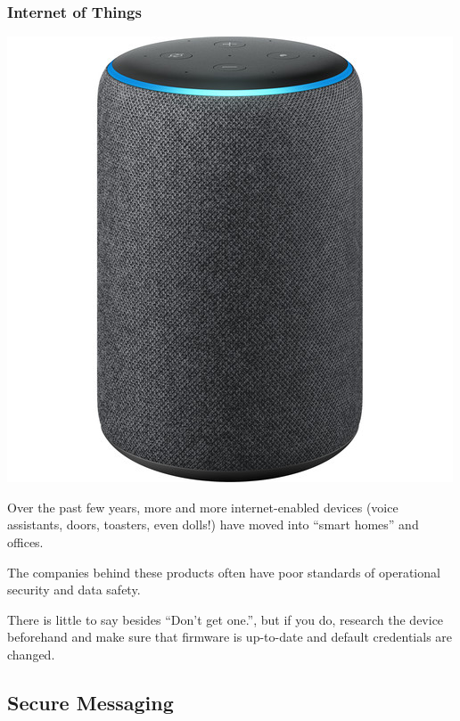 \documentclass[aspectratio=1610,dvipsnames]{beamer}
\begin{document}
\begin{frame}
\frametitle{Internet of Things}

\begin{minipage}{0.4\textwidth}
\begin{center}
\includegraphics[scale=0.25,keepaspectratio]{images/alexa}
\end{center}
\end{minipage}%
\begin{minipage}{0.6\textwidth}
Over the past few years, more and more internet-enabled devices (voice assistants, doors, toasters, even dolls!) have moved into ``smart homes'' and offices.
\pause\medskip

The companies behind these products often have poor standards of operational security and data safety. 
\pause\medskip

There is little to say besides ``Don't get one.'', but if you do, research the device beforehand and make sure that firmware is up-to-date and default credentials are changed.
\end{minipage}
\end{frame}

\subsection{Secure Messaging}
\end{document}
